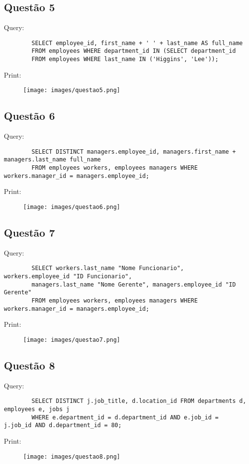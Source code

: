 \documentclass{article}[twocolumn]
\begin{document}
	\subsection{Quest\~ao 5}
	Query:
	\begin{verbatim}
		SELECT employee_id, first_name + ' ' + last_name AS full_name
		FROM employees WHERE department_id IN (SELECT department_id
		FROM employees WHERE last_name IN ('Higgins', 'Lee'));
	\end{verbatim}
	Print:
	\begin{figure}[H]
		\centering
		\texttt{[image: images/questao5.png]}
	\end{figure}
	\newpage
	\subsection{Quest\~ao 6}
	Query:
	\begin{verbatim}
		SELECT DISTINCT managers.employee_id, managers.first_name + managers.last_name full_name
		FROM employees workers, employees managers WHERE workers.manager_id = managers.employee_id;
	\end{verbatim}
	Print:
	\begin{figure}[H]
		\centering
		\texttt{[image: images/questao6.png]}
	\end{figure}
	\newpage
	\subsection{Quest\~ao 7}
	Query:
	\begin{verbatim}
		SELECT workers.last_name "Nome Funcionario", workers.employee_id "ID Funcionario",
		managers.last_name "Nome Gerente", managers.employee_id "ID Gerente"
		FROM employees workers, employees managers WHERE workers.manager_id = managers.employee_id;
	\end{verbatim}
	Print:
	\begin{figure}[H]
		\centering
		\texttt{[image: images/questao7.png]}
	\end{figure}
	\newpage
	\subsection{Quest\~ao 8}
	Query:
	\begin{verbatim}
		SELECT DISTINCT j.job_title, d.location_id FROM departments d, employees e, jobs j
		WHERE e.department_id = d.department_id AND e.job_id = j.job_id AND d.department_id = 80;
	\end{verbatim}
	Print:
	\begin{figure}[H]
		\centering
		\texttt{[image: images/questao8.png]}
	\end{figure}
	\newpage
\end{document}
